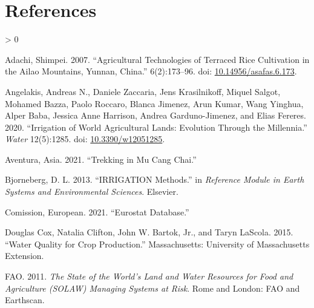 \documentclass[12pt,twoside]{reedthesis}
\newlength{\cslhangindent}
\newenvironment{CSLReferences}[2] %
 {%
  \setlength{\parindent}{0pt}
  \ifodd #1 \everypar{\setlength{\hangindent}{\cslhangindent}}\ignorespaces\fi
  \ifnum #2 > 0
  \setlength{\parskip}{#2\baselineskip}
  \fi
 }%
 {}
\begin{document}
\hypertarget{references}{%
\chapter*{References}\label{references}}


\noindent

\setlength{\parindent}{-0.20in}
\setlength{\leftskip}{0.20in}
\setlength{\parskip}{8pt}

\hypertarget{refs}{}
\begin{CSLReferences}{1}{0}
\leavevmode\hypertarget{ref-adachiAgriculturalTechnologiesTerraced2007}{}%
Adachi, Shimpei. 2007. {``Agricultural {Technologies} of {Terraced Rice Cultivation} in the {Ailao Mountains}, {Yunnan}, {China}.''} 6(2):173--96. doi: \href{https://doi.org/10.14956/asafas.6.173}{10.14956/asafas.6.173}.

\leavevmode\hypertarget{ref-angelakisIrrigationWorldAgricultural2020}{}%
Angelakis, Andreas N., Daniele Zaccaria, Jens Krasilnikoff, Miquel Salgot, Mohamed Bazza, Paolo Roccaro, Blanca Jimenez, Arun Kumar, Wang Yinghua, Alper Baba, Jessica Anne Harrison, Andrea Garduno-Jimenez, and Elias Fereres. 2020. {``Irrigation of {World Agricultural Lands}: {Evolution} Through the {Millennia}.''} \emph{Water} 12(5):1285. doi: \href{https://doi.org/10.3390/w12051285}{10.3390/w12051285}.

\leavevmode\hypertarget{ref-asiaaventuraTrekkingMuCang2021}{}%
Aventura, Asia. 2021. {``Trekking in {Mu Cang Chai}.''}

\leavevmode\hypertarget{ref-bjornebergIRRIGATIONMethods2013}{}%
Bjorneberg, D. L. 2013. {``{IRRIGATION} \textbar{} {Methods}.''} in \emph{Reference {Module} in {Earth Systems} and {Environmental Sciences}}. {Elsevier}.

\leavevmode\hypertarget{ref-europeancomissionEurostatDatabase2021}{}%
Comission, European. 2021. {``Eurostat {Database}.''}

\leavevmode\hypertarget{ref-douglascox2015}{}%
Douglas Cox, Natalia Clifton, John W. Bartok, Jr., and Taryn LaScola. 2015. {``Water Quality for Crop Production.''} Massachusetts: University of Massachusetts Extension.

\leavevmode\hypertarget{ref-faoStateWorldLand2011}{}%
FAO. 2011. \emph{The State of the World's Land and Water Resources for Food and Agriculture ({SOLAW}) {} {Managing} Systems at Risk}. {Rome and London}: {FAO and Earthscan}.


\end{CSLReferences}
\end{document}
